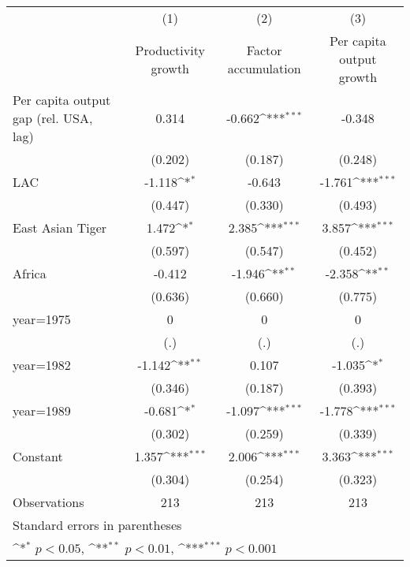 {
\def\sym#1{\ifmmode^{#1}\else\(^{#1}\)\fi}
\begin{tabular}{l*{3}{c}}
\hline\hline
                    &\multicolumn{1}{c}{(1)}&\multicolumn{1}{c}{(2)}&\multicolumn{1}{c}{(3)}\\
                    &\multicolumn{1}{c}{Productivity growth}&\multicolumn{1}{c}{Factor accumulation}&\multicolumn{1}{c}{Per capita output growth}\\
\hline
Per capita output gap (rel. USA, lag)&       0.314         &      -0.662\sym{***}&      -0.348         \\
                    &     (0.202)         &     (0.187)         &     (0.248)         \\
[1em]
LAC                 &      -1.118\sym{*}  &      -0.643         &      -1.761\sym{***}\\
                    &     (0.447)         &     (0.330)         &     (0.493)         \\
[1em]
East Asian Tiger    &       1.472\sym{*}  &       2.385\sym{***}&       3.857\sym{***}\\
                    &     (0.597)         &     (0.547)         &     (0.452)         \\
[1em]
Africa              &      -0.412         &      -1.946\sym{**} &      -2.358\sym{**} \\
                    &     (0.636)         &     (0.660)         &     (0.775)         \\
[1em]
year=1975           &           0         &           0         &           0         \\
                    &         (.)         &         (.)         &         (.)         \\
[1em]
year=1982           &      -1.142\sym{**} &       0.107         &      -1.035\sym{*}  \\
                    &     (0.346)         &     (0.187)         &     (0.393)         \\
[1em]
year=1989           &      -0.681\sym{*}  &      -1.097\sym{***}&      -1.778\sym{***}\\
                    &     (0.302)         &     (0.259)         &     (0.339)         \\
[1em]
Constant            &       1.357\sym{***}&       2.006\sym{***}&       3.363\sym{***}\\
                    &     (0.304)         &     (0.254)         &     (0.323)         \\
\hline
Observations        &         213         &         213         &         213         \\
\hline\hline
\multicolumn{4}{l}{\footnotesize Standard errors in parentheses}\\
\multicolumn{4}{l}{\footnotesize \sym{*} \(p<0.05\), \sym{**} \(p<0.01\), \sym{***} \(p<0.001\)}\\
\end{tabular}
}

